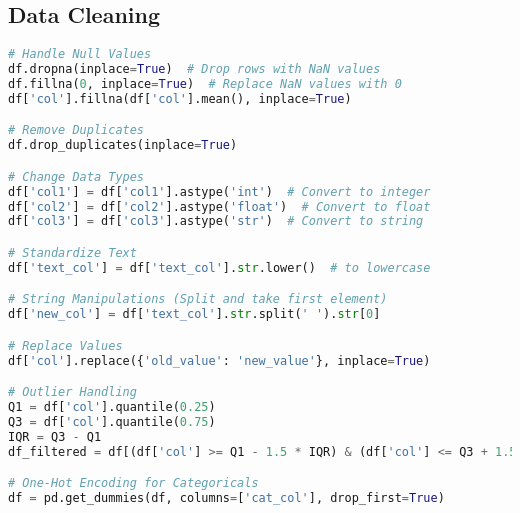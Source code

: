 \documentclass[english, threecolumn]{latex4ei/latex4ei_sheet}
\begin{document}
\begin{sectionbox}
\subsection{Data Cleaning}
\begin{lstlisting}[language=Python, gobble=0]
# Handle Null Values
df.dropna(inplace=True)  # Drop rows with NaN values
df.fillna(0, inplace=True)  # Replace NaN values with 0
df['col'].fillna(df['col'].mean(), inplace=True)

# Remove Duplicates
df.drop_duplicates(inplace=True)

# Change Data Types
df['col1'] = df['col1'].astype('int')  # Convert to integer
df['col2'] = df['col2'].astype('float')  # Convert to float
df['col3'] = df['col3'].astype('str')  # Convert to string

# Standardize Text
df['text_col'] = df['text_col'].str.lower()  # to lowercase

# String Manipulations (Split and take first element)
df['new_col'] = df['text_col'].str.split(' ').str[0] 

# Replace Values
df['col'].replace({'old_value': 'new_value'}, inplace=True)

# Outlier Handling
Q1 = df['col'].quantile(0.25)
Q3 = df['col'].quantile(0.75)
IQR = Q3 - Q1
df_filtered = df[(df['col'] >= Q1 - 1.5 * IQR) & (df['col'] <= Q3 + 1.5 * IQR)]

# One-Hot Encoding for Categoricals
df = pd.get_dummies(df, columns=['cat_col'], drop_first=True)
\end{lstlisting}
\end{sectionbox}
\end{document}
